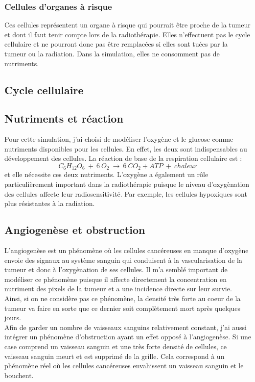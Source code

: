 \documentclass[12pt]{article}
\begin{document}
\subsubsection{Cellules d'organes à risque} 
Ces cellules représentent un organe à risque qui pourrait être proche de la tumeur et dont il faut tenir compte lors de la radiothérapie. Elles n'effectuent pas le cycle cellulaire et ne pourront donc pas être remplacées si elles sont tuées par la tumeur ou la radiation. Dans la simulation, elles ne consomment pas de nutriments.
\subsection{Cycle cellulaire}

\subsection{Nutriments et réaction}
Pour cette simulation, j'ai choisi de modéliser l'oxygène et le glucose comme nutriments disponibles pour les cellules. En effet, les deux sont indispensables au développement des cellules.
La réaction de base de la respiration cellulaire est : 
$$C_6H_{12}O_6 \ + \ 6 \ O_2 \ \rightarrow \ 6 \ CO_2 + ATP \ + \ chaleur$$
et elle nécessite ces deux nutriments. L'oxygène a également un rôle particulièrement important dans la radiothérapie puisque le niveau d'oxygènation des cellules affecte leur radiosensitivité. Par exemple, les cellules hypoxiques sont plus résistantes à la radiation.
\subsection{Angiogenèse et obstruction}
L'angiogenèse est un phénomène où les cellules cancéreuses en manque d'oxygène envoie des signaux au système sanguin qui conduisent à la vascularisation de la tumeur et donc à l'oxygènation de ses cellules. Il m'a semblé important de modéliser ce phénomène puisque il affecte directement la concentration en nutriment des pixels de la tumeur et a une incidence directe sur leur survie. Ainsi, si on ne considère pas ce phénomène, la densité très forte au coeur de la tumeur va faire en sorte que ce dernier soit complètement mort après quelques jours.\\

Afin de garder un nombre de vaisseaux sanguins relativement constant, j'ai aussi intégrer un phénomène d'obstruction ayant un effet opposé à l'angiogenèse. Si une case comprend un vaisseau sanguin et une très forte densité de cellules, ce vaisseau sanguin meurt et est supprimé de la grille. Cela correspond à un phénomène réel où les cellules cancéreuses envahissent un vaisseau sanguin et le bouchent.\\
\end{document}

